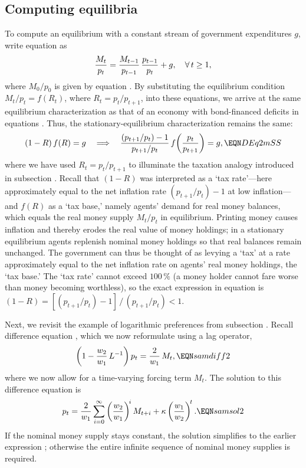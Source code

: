 %



\subsection{Computing equilibria}

To compute an equilibrium with a constant stream of government
expenditures $g$, write equation  as
$$
  {M_t \over p_t} = {M_{t-1} \over p_{t-1}}\,{p_{t-1} \over p_t}
     + g, \quad \forall\, t \geq 1,
$$
where ${M_0 / p_0}$ is given by equation .
By substituting the equilibrium condition $M_t / p_t = f(R_t)$, where
$R_t = p_t / p_{t+1}$, into these equations, we arrive at the same
equilibrium characterization as that of an economy with bond-financed
deficits in equations .
Thus, the stationary-equilibrium characterization  remains
the same:
$$
  (1-R)\,f(R) = g \quad \Longrightarrow \quad
  {(p_{t+1}/p_t) - 1 \over p_{t+1}/p_t}\,
        f\!\left({p_t \over p_{t+1}}\right) = g,
  \EQN DEq2mSS
$$
where we have used $R_t = p_t / p_{t+1}$ to illuminate the taxation
analogy introduced in subsection .
Recall that $(1-R)$ was interpreted as a `tax rate'---here
approximately equal to the net inflation rate $(p_{t+1}/p_t) - 1$
at low inflation---and $f(R)$ as a `tax base,' namely agents'
demand for real money balances, which equals the real money supply
$M_t/p_t$ in equilibrium.
Printing money causes inflation and thereby erodes the real value of
money holdings; in a stationary equilibrium agents replenish nominal
money holdings so that real balances remain unchanged.
The government can thus be thought of as levying a `tax' at a rate
approximately equal to the net inflation rate on agents' real money
holdings, the `tax base.'
The `tax rate' cannot exceed $100\,\%$ (a money holder cannot fare
worse than money becoming worthless), so the exact expression in
equation  is
$(1-R) = [(p_{t+1}/p_t) - 1]\,/\,(p_{t+1}/p_t) < 1$.

Next, we revisit the example of logarithmic preferences from
subsection .
Recall difference equation , which we now reformulate
using a lag operator,
$$
  \left(1 - {w_2 \over w_1}\,L^{-1}\right) p_t
       = {2 \over w_1}\,M_t,
  \EQN samdiff2
$$
where we now allow for a time-varying forcing term $M_t$.
The solution to this difference equation is
$$
  p_t = {2 \over w_1} \sum_{i=0}^{\infty}
             \left({w_2 \over w_1}\right)^{\!i} M_{t+i}
       + \kappa \left({w_1 \over w_2}\right)^{\!t}.
  \EQN samsol2
$$
If the nominal money supply stays constant, the solution simplifies
to the earlier expression ; otherwise the entire
infinite sequence of nominal money supplies is required.

